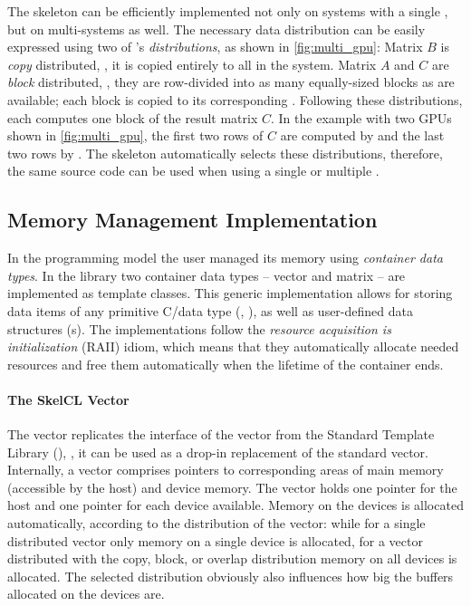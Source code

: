 The \allpairs skeleton can be efficiently implemented not only on systems with a single \GPU, but on multi-\GPU systems as well.
The necessary data distribution can be easily expressed using two of \SkelCL's \emph{distributions}, as shown in \autoref{fig:multi_gpu}:
Matrix $B$ is \emph{copy} distributed, \ie, it is copied entirely to all \GPUs in the system.
Matrix $A$ and $C$ are \emph{block} distributed, \ie, they are row-divided into as many equally-sized blocks as \GPUs are available;
each block is copied to its corresponding \GPU.
Following these distributions, each \GPU computes one block of the result matrix $C$.
In the example with two GPUs shown in \autoref{fig:multi_gpu}, the first two rows of $C$ are computed by  and the last two rows by .
The \allpairs skeleton automatically selects these distributions, therefore, the same source code can be used when using a single \GPU or multiple \GPUs.











\subsection{Memory Management Implementation}
\label{section:skelcl-library:memory-management}
In the \SkelCL programming model the user managed its memory using \emph{container data types}.
In the \SkelCL library two container data types -- vector and matrix -- are implemented as template classes.
This generic implementation allows for storing data items of any primitive C/\Cpp data type (\eg, ), as well as user-defined data structures (s).
The implementations follow the \emph{resource acquisition is initialization} (RAII) idiom, which means that they automatically allocate needed resources and free them automatically when the lifetime of the container ends.

\paragraph{The SkelCL Vector}
The \SkelCL vector replicates the interface of the vector from the \Cpp Standard Template Library (\STL), \ie, it can be used as a drop-in replacement of the standard vector.
Internally, a vector comprises pointers to corresponding areas of main memory (accessible by the host) and device memory.
The vector holds one pointer for the host and one pointer for each device available.
Memory on the devices is allocated automatically, according to the distribution of the vector:
while for a single distributed vector only memory on a single device is allocated, for a vector distributed with the copy, block, or overlap distribution memory on all devices is allocated.
The selected distribution obviously also influences how big the buffers allocated on the devices are.

